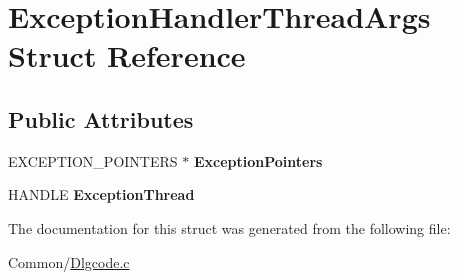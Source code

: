 \hypertarget{struct_exception_handler_thread_args}{}\section{Exception\+Handler\+Thread\+Args Struct Reference}
\label{struct_exception_handler_thread_args}
\subsection*{Public Attributes}
\begin{DoxyCompactItemize}
\item 
\mbox{\label{struct_exception_handler_thread_args_aaaadbbcbfb7626bd9485e902074fa44a}} 
E\+X\+C\+E\+P\+T\+I\+O\+N\+\_\+\+P\+O\+I\+N\+T\+E\+RS $\ast$ {\bfseries Exception\+Pointers}
\item 
\mbox{\label{struct_exception_handler_thread_args_af2dd82061c73840cf7e57dad888f2b03}} 
H\+A\+N\+D\+LE {\bfseries Exception\+Thread}
\end{DoxyCompactItemize}


The documentation for this struct was generated from the following file\+:\begin{DoxyCompactItemize}
\item 
Common/\hyperlink{_dlgcode_8c}{Dlgcode.\+c}\end{DoxyCompactItemize}
